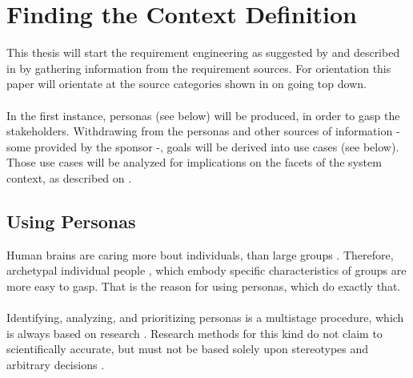 \section{Finding the Context Definition}
This thesis will start the requirement engineering as suggested by \textcite{Pohl.2007} and described in  by gathering information from the requirement sources. For orientation this paper will orientate at the source categories shown in  on  going top down. 

\paragraph{} In the first instance, personas (see below) will be produced, in order to gasp the stakeholders. Withdrawing from the personas and other sources of information - some provided by the sponsor -, goals will be derived into use cases (see below). Those use cases will be analyzed for implications on the facets of the system context, as described on . 


\subsection{Using Personas}
Human brains are caring more bout individuals, than large groups \parencite[cf.][]{Platt.2016}. Therefore, archetypal individual people \parencite[cf.][81-82]{Cooper.2007}, which embody specific characteristics of groups \parencite[cf.][]{Platt.2016} are more easy to gasp. That is the reason for using personas, which do exactly that.

\paragraph{} Identifying, analyzing, and prioritizing personas is a multistage procedure, which is always based on research \parencite[cf.][39]{Robier.2016}. Research methods for this kind do not claim to scientifically accurate, but must not be based solely upon stereotypes and arbitrary decisions \parencite[cf.][82-83]{Cooper.2007}. 

